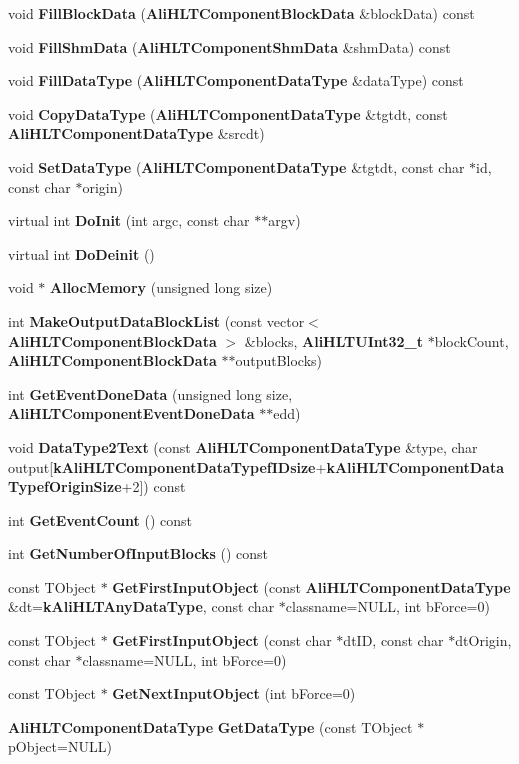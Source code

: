 \begin{CompactItemize}
\item 
void {\bf Fill\-Block\-Data} ({\bf Ali\-HLTComponent\-Block\-Data} \&block\-Data) const 
\item 
void {\bf Fill\-Shm\-Data} ({\bf Ali\-HLTComponent\-Shm\-Data} \&shm\-Data) const 
\item 
void {\bf Fill\-Data\-Type} ({\bf Ali\-HLTComponent\-Data\-Type} \&data\-Type) const 
\item 
void {\bf Copy\-Data\-Type} ({\bf Ali\-HLTComponent\-Data\-Type} \&tgtdt, const {\bf Ali\-HLTComponent\-Data\-Type} \&srcdt)
\item 
void {\bf Set\-Data\-Type} ({\bf Ali\-HLTComponent\-Data\-Type} \&tgtdt, const char $\ast$id, const char $\ast$origin)
\item 
virtual int {\bf Do\-Init} (int argc, const char $\ast$$\ast$argv)
\item 
virtual int {\bf Do\-Deinit} ()
\item 
void $\ast$ {\bf Alloc\-Memory} (unsigned long size)
\item 
int {\bf Make\-Output\-Data\-Block\-List} (const vector$<$ {\bf Ali\-HLTComponent\-Block\-Data} $>$ \&blocks, {\bf Ali\-HLTUInt32\_\-t} $\ast$block\-Count, {\bf Ali\-HLTComponent\-Block\-Data} $\ast$$\ast$output\-Blocks)
\item 
int {\bf Get\-Event\-Done\-Data} (unsigned long size, {\bf Ali\-HLTComponent\-Event\-Done\-Data} $\ast$$\ast$edd)
\item 
void {\bf Data\-Type2Text} (const {\bf Ali\-HLTComponent\-Data\-Type} \&type, char output[{\bf k\-Ali\-HLTComponent\-Data\-Typef\-IDsize}+{\bf k\-Ali\-HLTComponent\-Data\-Typef\-Origin\-Size}+2]) const 
\item 
int {\bf Get\-Event\-Count} () const 
\item 
int {\bf Get\-Number\-Of\-Input\-Blocks} () const 
\item 
const TObject $\ast$ {\bf Get\-First\-Input\-Object} (const {\bf Ali\-HLTComponent\-Data\-Type} \&dt={\bf k\-Ali\-HLTAny\-Data\-Type}, const char $\ast$classname=NULL, int b\-Force=0)
\item 
const TObject $\ast$ {\bf Get\-First\-Input\-Object} (const char $\ast$dt\-ID, const char $\ast$dt\-Origin, const char $\ast$classname=NULL, int b\-Force=0)
\item 
const TObject $\ast$ {\bf Get\-Next\-Input\-Object} (int b\-Force=0)
\item 
{\bf Ali\-HLTComponent\-Data\-Type} {\bf Get\-Data\-Type} (const TObject $\ast$p\-Object=NULL)
$$
\end{CompactItemize}
